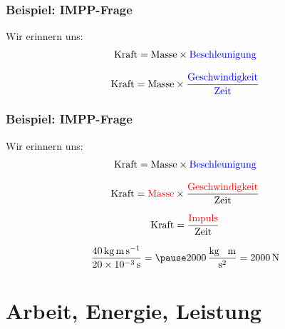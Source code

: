 \documentclass{beamer}
\begin{document}
\begin{frame}
\frametitle{Beispiel: IMPP-Frage}

Wir erinnern uns:\\

\[
\text{Kraft} = \text{Masse} \times \text{\textcolor{blue}{Beschleunigung}} 
\]

\pause

\[
\text{Kraft} = \text{Masse} \times \frac{\text{\textcolor{blue}{Geschwindigkeit}}}{\text{\textcolor{blue}{Zeit}}} 
\]


\end{frame}


\begin{frame}
\frametitle{Beispiel: IMPP-Frage}

Wir erinnern uns:\\

\[
\text{Kraft} = \text{Masse} \times \text{\textcolor{blue}{Beschleunigung}} 
\]

\[
\text{Kraft} = \text{\textcolor{red}{Masse}} \times \frac{\text{\textcolor{red}{Geschwindigkeit}}}{\text{Zeit}} 
\]

\pause


\[
\text{Kraft} =  \frac{\text{\textcolor{red}{Impuls}}}{\text{Zeit}} 
\]

\pause

\[
\frac{40\,\text{kg}\,\text{m}\,\text{s}^{-1}}{20\times 10^{-3}\,\text{s}} = \pause  2000\,\frac{\text{kg \, m}}{\text{s}^2} = 2000\,\text{N}
\]

\end{frame}











\section{Arbeit, Energie, Leistung}
\end{document}
